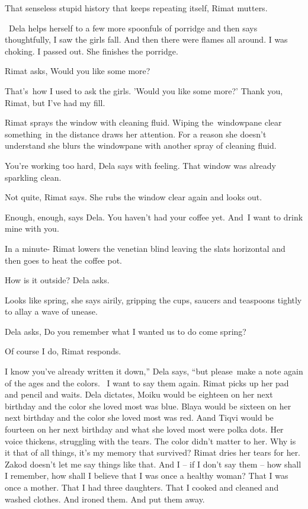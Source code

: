 \documentclass[letterpaper]{article}
\begin{document}
{\textquotedbl}That senseless stupid history that keeps repeating itself,{\textquotedbl} Rimat mutters.

~Dela helps herself to a few more spoonfuls of porridge and then says thoughtfully, {\textquotedbl}I saw the girls fall.
And then there were flames all around. I was choking. I passed out.{\textquotedbl} She finishes the porridge.

Rimat asks, {\textquotedbl}Would you like some more?{\textquotedbl} 

{\textquotedbl}That's~how I used to ask the girls. 'Would you like some more?' Thank you, Rimat, but I've had my
fill.{\textquotedbl} 

Rimat sprays the window with cleaning fluid. Wiping the\ windowpane clear something\textcolor{red}{\ }in the distance
draws her attention. For a reason she doesn't understand she blurs the windowpane with another spray of cleaning fluid.


{\textquotedbl}You're working too hard,{\textquotedbl} Dela says with feeling. {\textquotedbl}That window was already
sparkling clean.{\textquotedbl} 

{\textquotedbl}Not quite,{\textquotedbl} Rimat says. She rubs the window clear again and looks out. 

{\textquotedbl}Enough, enough,{\textquotedbl} says Dela. {\textquotedbl}You haven't had your coffee yet.
And\textcolor{red}{\ }I want to drink mine with you.{\textquotedbl} 

{\textquotedbl}In a minute{}-{\textquotedbl} Rimat lowers the venetian blind leaving the slats horizontal and then goes
to heat the coffee pot.

{\textquotedbl}How is it outside?{\textquotedbl} Dela asks. 

{\textquotedbl}Looks like spring,{\textquotedbl} she says airily, gripping the cups, saucers and teaspoons tightly to
allay a wave of unease.

Dela asks, {\textquotedbl}Do you remember what I wanted us to do come spring?{\textquotedbl}

{\textquotedbl}Of course I do,{\textquotedbl} Rimat responds. 

{\textquotedbl}I know you've already written it down,'' Dela says, ``but please~make a note again of the ages and the
colors. ~I want to say them again.{\textquotedbl} Rimat picks up her pad and pencil and waits. Dela dictates,
{\textquotedbl}Moiku would be eighteen on her next birthday and the color she loved most was blue. Blaya would be
sixteen on her next birthday and the color she loved most was red. Aand Tiqvi would be fourteen on her next birthday
and what she loved most were polka dots.{\textquotedbl} Her voice thickens, struggling with the tears.
{\textquotedbl}The color didn't matter to her. Why is it that of all things, it's my memory that
survived?{\textquotedbl} Rimat dries her tears for her. {\textquotedbl}Zakod doesn't let me say things like that. And I
-- if I don't say them -- how shall I remember, how shall I believe that I was once a healthy woman? That I was once a
mother. That I had three daughters. That I cooked and cleaned and washed clothes. And ironed them. And put them
away.{\textquotedbl} 
\end{document}

